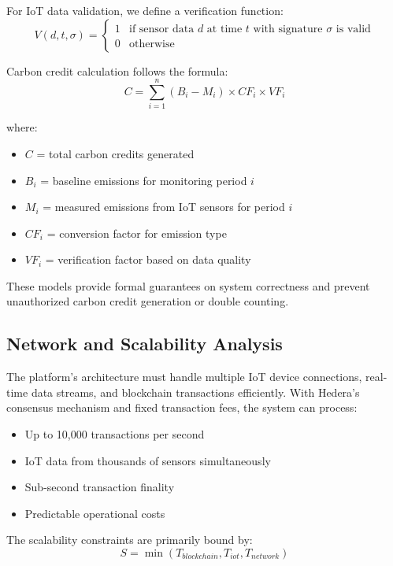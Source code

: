\documentclass[oneside,a4paper,12pt]{book}
\begin{document}
\begin{appendices}
For IoT data validation, we define a verification function:
\begin{equation}
V(d, t, \sigma) = \begin{cases}
1 & \text{if sensor data } d \text{ at time } t \text{ with signature } \sigma \text{ is valid} \\
0 & \text{otherwise}
\end{cases}
\end{equation}

Carbon credit calculation follows the formula:
\begin{equation}
C = \sum_{i=1}^{n} (B_i - M_i) \times CF_i \times VF_i
\end{equation}

where:
\begin{itemize}
\item $C$ = total carbon credits generated
\item $B_i$ = baseline emissions for monitoring period $i$
\item $M_i$ = measured emissions from IoT sensors for period $i$
\item $CF_i$ = conversion factor for emission type
\item $VF_i$ = verification factor based on data quality
\end{itemize}

These models provide formal guarantees on system correctness and prevent unauthorized carbon credit generation or double counting.

\subsection{Network and Scalability Analysis}
The platform's architecture must handle multiple IoT device connections, real-time data streams, and blockchain transactions efficiently. With Hedera's consensus mechanism and fixed transaction fees, the system can process:
\begin{itemize}
\item Up to 10,000 transactions per second
\item IoT data from thousands of sensors simultaneously
\item Sub-second transaction finality
\item Predictable operational costs
\end{itemize}

The scalability constraints are primarily bound by:
\begin{equation}
S = \min(T_{blockchain}, T_{iot}, T_{network})
\end{equation}


\end{appendices}
\end{document}
